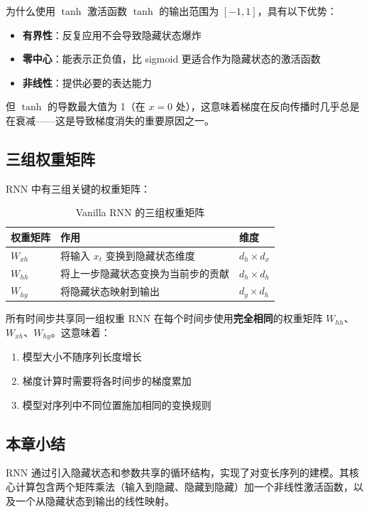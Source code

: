 \begin{knowledgebox}{为什么使用 $\tanh$ 激活函数}
$\tanh$ 的输出范围为 $[-1, 1]$，具有以下优势：
\begin{itemize}
    \item \textbf{有界性}：反复应用不会导致隐藏状态爆炸
    \item \textbf{零中心}：能表示正负值，比 sigmoid 更适合作为隐藏状态的激活函数
    \item \textbf{非线性}：提供必要的表达能力
\end{itemize}
但 $\tanh$ 的导数最大值为 1（在 $x=0$ 处），这意味着梯度在反向传播时几乎总是在衰减——这是导致梯度消失的重要原因之一。
\end{knowledgebox}

\subsection{三组权重矩阵}

RNN 中有三组关键的权重矩阵：

\begin{table}[H]
\centering
\begin{tabular}{lll}
\toprule
\textbf{权重矩阵} & \textbf{作用} & \textbf{维度} \\
\midrule
$W_{xh}$ & 将输入 $x_t$ 变换到隐藏状态维度 & $d_h \times d_x$ \\
$W_{hh}$ & 将上一步隐藏状态变换为当前步的贡献 & $d_h \times d_h$ \\
$W_{hy}$ & 将隐藏状态映射到输出 & $d_y \times d_h$ \\
\bottomrule
\end{tabular}
\caption{Vanilla RNN 的三组权重矩阵}
\end{table}

\begin{warningbox}{所有时间步共享同一组权重}
RNN 在每个时间步使用\textbf{完全相同}的权重矩阵 $W_{hh}$、$W_{xh}$、$W_{hy}$。这意味着：
\begin{enumerate}
    \item 模型大小不随序列长度增长
    \item 梯度计算时需要将各时间步的梯度累加
    \item 模型对序列中不同位置施加相同的变换规则
\end{enumerate}
\end{warningbox}

\subsection{本章小结}

RNN 通过引入隐藏状态和参数共享的循环结构，实现了对变长序列的建模。其核心计算包含两个矩阵乘法（输入到隐藏、隐藏到隐藏）加一个非线性激活函数，以及一个从隐藏状态到输出的线性映射。


